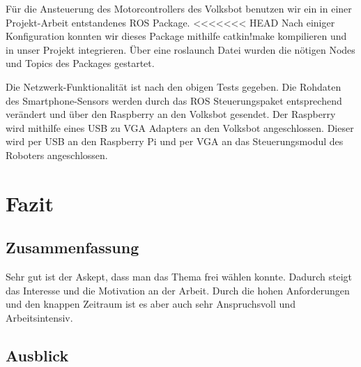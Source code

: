 \documentclass[12pt]{article}
\begin{document}
Für die Ansteuerung des Motorcontrollers des Volksbot benutzen wir ein in einer Projekt-Arbeit entstandenes ROS Package.
<<<<<<< HEAD
Nach einiger Konfiguration konnten wir dieses Package mithilfe catkin!make kompilieren und in unser Projekt integrieren.
Über eine roslaunch Datei wurden die nötigen Nodes und Topics des Packages gestartet.

Die Netzwerk-Funktionalität ist nach den obigen Tests gegeben.
Die Rohdaten des Smartphone-Sensors werden durch das ROS Steuerungspaket entsprechend verändert und über den Raspberry an den Volksbot gesendet.
Der Raspberry wird mithilfe eines USB zu VGA Adapters an den Volksbot angeschlossen. Dieser wird per USB an den Raspberry Pi und per VGA an das Steuerungsmodul des Roboters angeschlossen.















\section{Fazit}
\subsection{Zusammenfassung}

Sehr gut ist der Askept, dass man das Thema frei wählen konnte. Dadurch steigt das Interesse und die Motivation an der Arbeit. Durch die hohen Anforderungen und den knappen Zeitraum ist es aber auch sehr Anspruchsvoll und Arbeitsintensiv. 


\subsection{Ausblick}
\end{document}
